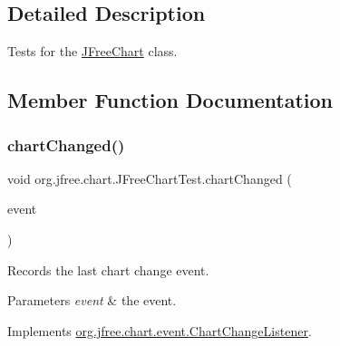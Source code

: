 \subsection{Detailed Description}
Tests for the \mbox{\hyperlink{classorg_1_1jfree_1_1chart_1_1_j_free_chart}{J\+Free\+Chart}} class. 

\subsection{Member Function Documentation}
\mbox{\label{classorg_1_1jfree_1_1chart_1_1_j_free_chart_test_a97b21a47b203de35fe1496bf28fdfc75}} 
\subsubsection{\texorpdfstring{chart\+Changed()}{chartChanged()}}
{\footnotesize\ttfamily void org.\+jfree.\+chart.\+J\+Free\+Chart\+Test.\+chart\+Changed (\begin{DoxyParamCaption}\item[{\mbox{\hyperlink{classorg_1_1jfree_1_1chart_1_1event_1_1_chart_change_event}{Chart\+Change\+Event}}}]{event }\end{DoxyParamCaption})}

Records the last chart change event.


\begin{DoxyParams}{Parameters}
{\em event} & the event. \\
\hline
\end{DoxyParams}


Implements \mbox{\hyperlink{interfaceorg_1_1jfree_1_1chart_1_1event_1_1_chart_change_listener_ac4ad92c4f9cc7be26964dab79d882bee}{org.\+jfree.\+chart.\+event.\+Chart\+Change\+Listener}}.

\mbox{\label{classorg_1_1jfree_1_1chart_1_1_j_free_chart_test_aadf9ccaef7e3bc49f050c6ec15f2e325}} 
